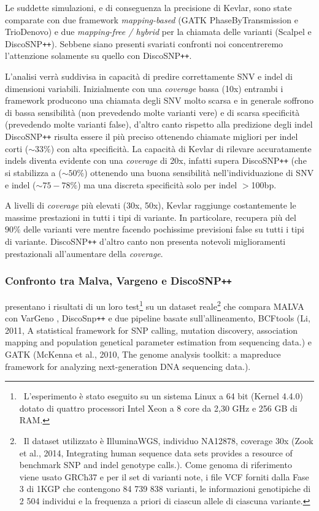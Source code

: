 \documentclass[../main.tex]{subfiles}
\begin{document}
Le suddette simulazioni, e di conseguenza la precisione di Kevlar, sono state comparate con due framework \textit{mapping-based} (GATK PhaseByTransmission e TrioDenovo) e due \textit{mapping-free / hybrid} per la chiamata delle varianti (Scalpel e DiscoSNP\texttt{++}). Sebbene siano presenti svariati confronti noi concentreremo l'attenzione solamente su quello con DiscoSNP\texttt{++}. 

L'analisi verrà suddivisa in capacità di predire correttamente SNV e indel di dimensioni variabili. Inizialmente con una \textit{coverage} bassa (10x) entrambi i framework producono una chiamata degli SNV molto scarsa e in generale soffrono di bassa sensibilità (non prevedendo molte varianti vere) e di scarsa specificità (prevedendo molte varianti false), d'altro canto rispetto alla predizione degli indel DiscoSNP\texttt{++} risulta essere il più preciso ottenendo chiamate migliori per indel corti ($\sim 33\%$) con alta specificità. La capacità di Kevlar di rilevare accuratamente indels diventa evidente con una \textit{coverage} di 20x, infatti supera DiscoSNP\texttt{++} (che si stabilizza a ($\sim 50\%$) ottenendo una buona sensibilità nell'individuazione di SNV e indel ($\sim 75-78\%$) ma una discreta specificità solo per indel $>$100bp. 

A livelli di \textit{coverage} più elevati (30x, 50x), Kevlar raggiunge costantemente le massime prestazioni in tutti i tipi di variante. In particolare, recupera più del $90\%$ delle varianti vere mentre facendo pochissime previsioni false su tutti i tipi di variante. DiscoSNP\texttt{++} d'altro canto non presenta notevoli miglioramenti prestazionali all'aumentare della \textit{coverage}.

\subsubsection{Confronto tra Malva, Vargeno e DiscoSNP\texttt{++}}

\noindent
\cite{bernardini2019malva} presentano i risultati di un loro test\footnote{\ L'esperimento è stato eseguito su un sistema Linux a 64 bit (Kernel 4.4.0) dotato di quattro processori Intel Xeon a 8 core da 2,30 GHz e 256 GB di RAM.} su un dataset reale\footnote{\ Il dataset utilizzato è IlluminaWGS, individuo NA12878, coverage 30x (Zook et al., 2014, Integrating human sequence data sets provides a resource of benchmark SNP and indel genotype calls.). Come genoma di riferimento viene usato GRCh37 e per il set di varianti note, i file VCF forniti dalla Fase 3 di 1KGP che contengono  84 739 838 varianti, le informazioni genotipiche di 2 504 individui e la frequenza a priori di ciascun allele di ciascuna variante.} che compara MALVA con VarGeno \cite{sun-medvedev2018vargeno}, DiscoSnp\texttt{++} \cite{peterlongo2017discosnp++} e due pipeline basate sull'allineamento, BCFtools (Li, 2011, A statistical framework for SNP calling, mutation discovery, association mapping and population genetical parameter estimation from sequencing data.) e GATK (McKenna et al., 2010, The genome analysis toolkit: a mapreduce framework for analyzing next-generation DNA sequencing data.). 
\end{document}
